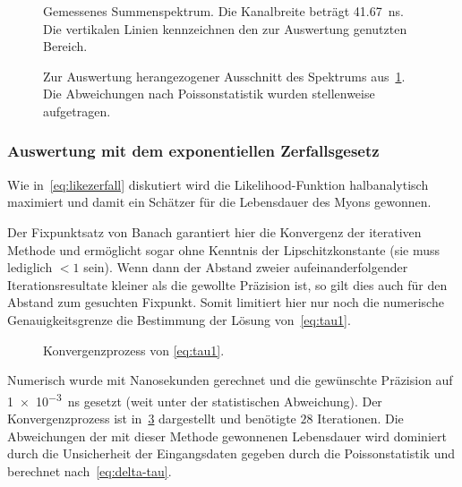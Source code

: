 \documentclass[slug=LM, room=Andreas-Schubert-Bau\,\ K\ 1A, supervisor=Anne-Sophie\ Berthold, coursedate=13.\ 12.\ 2019]{../../Lab_Report_LaTeX/lab_report}
\begin{document}
\begin{figure}[h]\centering
  
  \caption[Gemessenes Summenspektrum Hauptversuch]{Gemessenes Summenspektrum. Die Kanalbreite betr\"agt
    \SI{41.67}{\nano\second}. Die vertikalen Linien kennzeichnen den
    zur Auswertung genutzten Bereich.}
  \label{fig:haupt-spectrum_overview}
\end{figure}
\begin{figure}[h]\centering
  
  \caption[Detailansicht des gemessenen Spektrums]{Zur Auswertung
    herangezogener Ausschnitt des Spektrums
    aus~\ref{fig:haupt-spectrum_overview}. Die Abweichungen nach
    Poissonstatistik wurden stellenweise aufgetragen.}
  \label{fig:haupt-spectrum_detail}
\end{figure}

\subsubsection{Auswertung mit dem exponentiellen Zerfallsgesetz}
\label{sec:auswertung-mit-dem-1}

Wie in~\ref{eq:likezerfall} diskutiert wird die Likelihood-Funktion
halbanalytisch maximiert und damit ein Sch\"atzer f\"ur die
Lebensdauer des Myons gewonnen.

Der Fixpunktsatz von Banach garantiert hier die Konvergenz der
iterativen Methode und erm\"oglicht sogar ohne Kenntnis der
Lipschitzkonstante (sie muss lediglich \(< 1\) sein). Wenn dann der
Abstand zweier aufeinanderfolgender Iterationsresultate kleiner als
die gewollte Pr\"azision ist, so gilt dies auch f\"ur den Abstand zum
gesuchten Fixpunkt. Somit limitiert hier nur noch die numerische
Genauigkeitsgrenze die Bestimmung der L\"osung von~\ref{eq:tau1}.

\begin{figure}[h]\centering
  
  \caption{Konvergenzprozess von \ref{eq:tau1}.}
  \label{fig:haupt-continous}
\end{figure}

Numerisch wurde mit Nanosekunden gerechnet und die gew\"unschte
Pr\"azision auf \SI{1e-3}{\nano\second} gesetzt (weit unter der
statistischen Abweichung). Der Konvergenzprozess
ist in~\ref{fig:haupt-continous} dargestellt und ben\"otigte \(28\)
Iterationen. Die Abweichungen der mit dieser Methode gewonnenen
Lebensdauer wird dominiert durch die Unsicherheit der Eingangsdaten
gegeben durch die Poissonstatistik und berechnet
nach~\ref{eq:delta-tau}.
\end{document}
